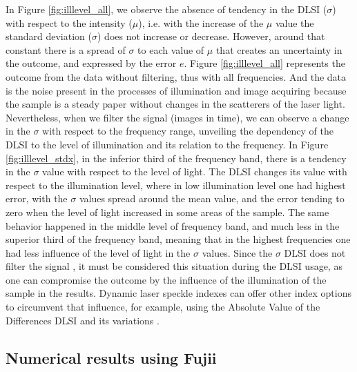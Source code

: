 \documentclass[review]{elsarticle}
\begin{document}
In Figure \ref{fig:illlevel_all}, we observe the absence of tendency in the DLSI ($\sigma$) with respect to the intensity ($\mu$), i.e. with the increase of the $\mu$ value the standard deviation ($\sigma$) does not increase or decrease. However, around that constant there is a spread of $\sigma$ to each value of $\mu$ that creates an uncertainty in the outcome, and expressed by the error $e$. Figure \ref{fig:illlevel_all} represents the outcome from the data without filtering, thus with all frequencies. And the data is the noise present in the processes of illumination and image acquiring because the sample is a steady paper without changes in the scatterers of the laser light.
Nevertheless, when we filter the signal (images in time), we can observe a change in the $\sigma$ with respect to the frequency range, unveiling the dependency of the DLSI to the level of illumination and its relation to the frequency.
In Figure \ref{fig:illlevel_stdx}, in the inferior third of the frequency band, there is a tendency in the $\sigma$ value with respect to the level of light. The DLSI changes its value with respect to the illumination level, where in low illumination level one had highest error, with the $\sigma$ values spread around the mean value, and the error tending to zero when the level of light increased in some areas of the sample. The same behavior happened in the middle level of frequency band, and much less in the superior third of the frequency band, meaning that in the highest frequencies one had less influence of the level of light in the $\sigma$ values. Since the $\sigma$ DLSI does not filter the signal \cite{RIVERA2017144}, it must be considered this situation during the DLSI usage, as one can compromise the outcome by the influence of the illumination of the sample in the results. Dynamic laser speckle indexes can offer other index  options to circumvent that influence, for example, using the Absolute Value of the Differences DLSI and its variations \cite{BSLTLBOOK}.

\subsection{Numerical results using Fujii} 
\label{subsec:vsfujii}
\end{document}
